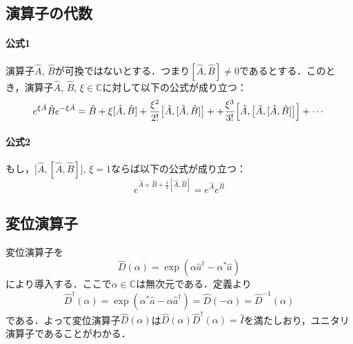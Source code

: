 \subsection{演算子の代数}
\paragraph{公式1}
演算子$\hat{A}$, $\hat{B}$が可換ではないとする．つまり$[\hat{A}, \hat{B}]\neq0$であるとする．このとき，演算子$\hat{A}$, $\hat{B}$, $\xi\in\mathbb{C}$に対して以下の公式が成り立つ：
\begin{equation}
    e^{\xi\hat{A}}\hat{B}e^{-\xi\hat{A}}
    =\hat{B}+\xi[\hat{A}, \hat{B}]
    +\frac{\xi^2}{2!}\bigl[
    \hat{A}, [\hat{A}, \hat{B}]
    \bigr]
    ++\frac{\xi^3}{3!}
    \Bigl[\hat{A},
    \bigl[
    \hat{A}, [\hat{A}, \hat{B}]
    \bigr]
    \Bigr]
    +\cdots
\end{equation}



\paragraph{公式2}
もし，$\bigl[\hat{A}, [\hat{A}, \hat{B}]\bigr]$, $\xi=1$ならば以下の公式が成り立つ：
\begin{equation}
    e^{\hat{A}+\hat{B}+\frac{1}{2}[\hat{A}, \hat{B}]}
    =e^{\hat{A}}e^{\hat{B}}
\end{equation}

\subsection{変位演算子}
変位演算子を
\begin{equation}
    \hat{D}(\alpha)=\exp{(\alpha\hat{a}^\dagger-\alpha^\ast\hat{a})}
\end{equation}
により導入する．ここで$\alpha\in \mathbb{C}$は無次元である．定義より
\begin{equation}
    \hat{D}^\dagger(\alpha)=\exp{(\alpha^\ast\hat{a}-\alpha\hat{a}^\dagger)}
    =\hat{D}(-\alpha)=\hat{D}^{-1}(\alpha)
\end{equation}
である．よって変位演算子$\hat{D}(\alpha)$は$\hat{D}(\alpha)\hat{D}^\dagger(\alpha)=\hat{I}$を満たしおり，ユニタリ演算子であることがわかる．


